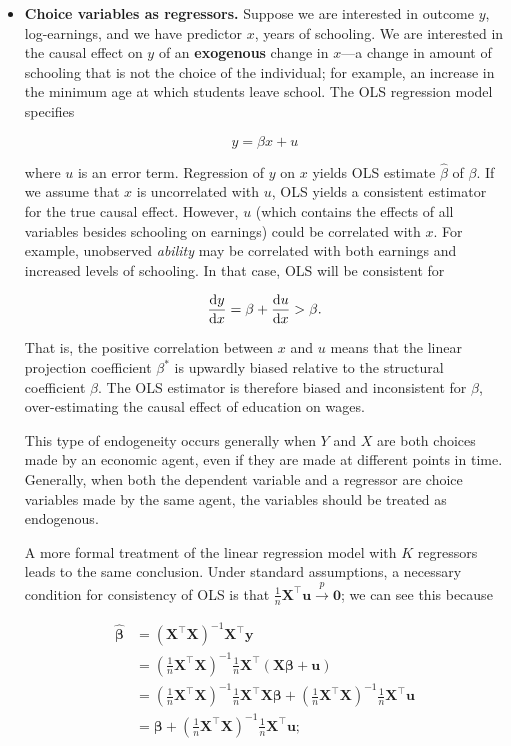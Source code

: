 \begin{itemize}
\item \textbf{Choice variables as regressors.} Suppose we are interested in outcome \(y\), log-earnings, and we have predictor \(x\), years of schooling. We are interested in the causal effect on \(y\) of an \textbf{exogenous} change in \(x\)---a change in amount of schooling that is not the choice of the individual; for example, an increase in the minimum age at which students leave school. The OLS regression model specifies

\[
y = \beta x + u
\]

where \(u\) is an error term. Regression of \(y\) on \(x\) yields OLS estimate \(\hat{\beta}\) of \(\beta\). If we assume that \(x\) is uncorrelated with \(u\), OLS yields a consistent estimator for the true causal effect. However, \(u\) (which contains the effects of all variables besides schooling on earnings) could be correlated with \(x\). For example, unobserved \textit{ability} may be correlated with both earnings and increased levels of schooling. In that case, OLS will be consistent for

\[
\deriv{y}{x} = \beta + \deriv{u}{x} > \beta.
\]

That is, the positive correlation between \(x\) and \(u\) means that the linear projection coefficient \(\beta^*\) is upwardly biased relative to the structural coefficient \(\beta\). The OLS estimator is therefore biased and inconsistent for \(\beta\), over-estimating the causal effect of education on wages.

This type of endogeneity occurs generally when \(Y\) and \(X\) are both choices made by an economic agent, even if they are made at different points in time. Generally, when both the dependent variable and a regressor are choice variables made by the same agent, the variables should be treated as endogenous.

A more formal treatment of the linear regression model with \(K\) regressors leads to the same conclusion. Under standard assumptions, a necessary condition for consistency of OLS is that \(\frac{1}{n} \boldsymbol{X}^\top \boldsymbol{u} \xrightarrow{p} \boldsymbol{0}\); we can see this because

\begin{align*}
\hat{\boldsymbol{\beta}} &= \left(\boldsymbol{X}^\top \boldsymbol{X}\right)^{-1} \boldsymbol{X}^\top \boldsymbol{y}
\\ &= \left( \frac{1}{n} \boldsymbol{X}^\top \boldsymbol{X}\right)^{-1} \frac{1}{n} \boldsymbol{X}^\top \left( \boldsymbol{X}\boldsymbol{\beta} + \boldsymbol{u} \right)
\\ &= \left( \frac{1}{n} \boldsymbol{X}^\top \boldsymbol{X}\right)^{-1} \frac{1}{n} \boldsymbol{X}^\top \boldsymbol{X}\boldsymbol{\beta} + \left( \frac{1}{n} \boldsymbol{X}^\top \boldsymbol{X}\right)^{-1} \frac{1}{n} \boldsymbol{X}^\top  \boldsymbol{u} 
\\ &= \boldsymbol{\beta} + \left( \frac{1}{n} \boldsymbol{X}^\top \boldsymbol{X}\right)^{-1} \frac{1}{n} \boldsymbol{X}^\top  \boldsymbol{u} ;
\end{align*}


\end{itemize}
